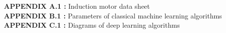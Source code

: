 \singlespacing

\textbf{APPENDIX A.1 :} Induction motor data sheet\\
\textbf{APPENDIX B.1 :} Parameters of classical machine learning algorithms\\
\textbf{APPENDIX C.1 :} Diagrams of deep learning algorithms\\





\newpage